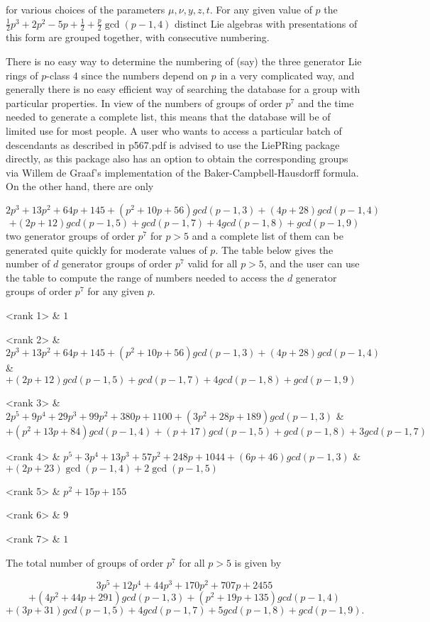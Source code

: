for various choices of the parameters $\mu ,\nu ,y,z,t$. For any given value
of $p$ the $\frac{1}{2}p^{3}+2p^{2}-5p+\frac{1}{2}+\frac{p}{2}\gcd (p-1,4)$
distinct Lie algebras with presentations of this form are grouped together,
with consecutive numbering.

There is no easy way to determine the numbering of (say) the three generator
Lie rings of $p$-class 4 since the numbers depend on $p$ in a very
complicated way, and generally there is no easy efficient way of searching
the database for a group with particular properties. In view of the numbers
of groups of order $p^{7}$ and the time needed to generate a complete list,
this means that the database will be of limited use for most people. A user
who wants to access a particular batch of descendants as described in
p567.pdf is advised to use the LiePRing package directly, as this package
also has an option to obtain the corresponding groups via Willem de Graaf's
implementation of the Baker-Campbell-Hausdorff formula. On the other hand,
there are only 

$$
2p^{3}+13p^{2}+64p+145+(p^{2}+10p+56) gcd(p-1,3)+(4p+28) gcd(p-1,4)
$$
$$
 +(2p+12) gcd(p-1,5)+ gcd(p-1,7)+4 gcd(p-1,8)+ gcd(p-1,9)
$$
two generator groups of order $p^{7}$ for $p>5$ and a complete list of them
can be generated quite quickly for moderate values of $p$. The table below
gives the number of $d$ generator groups of order $p^{7}$ valid for all 
$p>5$, and the user can use the table to compute the range of numbers needed 
to access the $d$ generator groups of order $p^{7}$ for any given $p$.

\beginitems
<rank 1> & $1$ 

<rank 2> 
    & $2p^{3}+13p^{2}+64p+145+(p^{2}+10p+56)gcd (p-1,3) +(4p+28)gcd (p-1,4)$
    & $+(2p+12)gcd (p-1,5)+gcd (p-1,7)+4gcd (p-1,8)+gcd (p-1,9)$

<rank 3> 
      & $2p^{5}+9p^{4}+29p^{3}+99p^{2}+380p+1100+(3p^{2}+28p+189)gcd (p-1,3)$
      & $+(p^{2}+13p+84)gcd (p-1,4)+(p+17)gcd (p-1,5)+gcd (p-1,8)+3gcd (p-1,7)$

<rank 4> 
      & $p^{5}+3p^{4}+13p^{3}+57p^{2}+248p+1044+(6p+46)gcd (p-1,3)$ 
      & $+(2p+23)\gcd (p-1,4)+2\gcd (p-1,5)$ 

<rank 5> & $p^{2}+15p+155$ 

<rank 6> & $9$ 

<rank 7> & $1$
\enditems

The total number of groups of order $p^{7}$ for all $p > 5$ is given by

$$
3p^{5}+12p^{4}+44p^{3}+170p^{2}+707p+2455
$$
$$
+(4p^{2}+44p+291)gcd (p-1,3)+(p^{2}+19p+135)gcd (p-1,4) 
$$
$$
+(3p+31)gcd (p-1,5)+4gcd (p-1,7)+5gcd (p-1,8)+gcd (p-1,9).
$$

